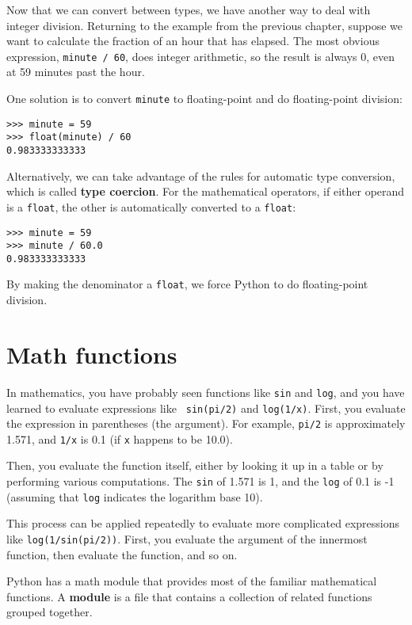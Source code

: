Now that we can convert between types, we have another way to deal
with integer division.  Returning to the example from the previous
chapter, suppose we want to calculate the fraction of an hour that has
elapsed.  The most obvious expression, {\tt minute / 60}, does integer
arithmetic, so the result is always 0, even at 59 minutes
past the hour.

One solution is to convert {\tt minute} to floating-point
and do floating-point division:

\beforeverb
\begin{verbatim}
>>> minute = 59
>>> float(minute) / 60
0.983333333333
\end{verbatim}
\afterverb
%
Alternatively, we can take advantage of the rules for
automatic type conversion, which is called {\bf type coercion}.
For the mathematical operators, if either operand is a {\tt float},
the other is automatically converted to a {\tt float}:

\beforeverb
\begin{verbatim}
>>> minute = 59
>>> minute / 60.0
0.983333333333
\end{verbatim}
\afterverb
%
By making the denominator a {\tt float}, we force Python to do
floating-point division.


\section{Math functions}

In mathematics, you have probably seen functions like {\tt sin} and
{\tt log}, and you have learned to evaluate expressions like {\tt
sin(pi/2)} and {\tt log(1/x)}.  First, you evaluate the expression in
parentheses (the argument).  For example, {\tt pi/2} is approximately
1.571, and {\tt 1/x} is 0.1 (if {\tt x} happens to be 10.0).

Then, you evaluate the function itself, either by looking it up in a
table or by performing various computations.  The {\tt sin} of 1.571
is 1, and the {\tt log} of 0.1 is -1 (assuming that {\tt log}
indicates the logarithm base 10).

This process can be applied repeatedly to evaluate more complicated
expressions like {\tt log(1/sin(pi/2))}.  First, you evaluate the
argument of the innermost function, then evaluate the function, and so
on.

Python has a math module that provides most of the familiar
mathematical functions.  A {\bf module} is a file that contains a
collection of related functions grouped together.

